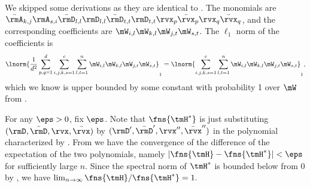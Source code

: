 \begin{proofof}{}
\begin{proofof}{}
We skipped some derivations as they are identical to .
The monomials are\\ $\bar{\rmA}_{k,j}\rmA_{s,i}\bar{\rmD}_{l,l}\rmD_{l,l}\bar{\rmD}_{t,t}\rmD_{t,t}\rvx_p\bar\rvx_p\rvx_q\bar\rvx_q$, and the corresponding coefficients are $\mW_{i,l}\mW_{k,l}\mW_{j,t}\mW_{s,t}$.
The $\ell_1$ norm of the coefficients is
\begin{equation}
\begin{split}
    \lnorm{\frac{1}{d^2}\sum_{p,q=1}^d\sum_{i,j,k,s=1}^c\sum_{l,t=1}^n \mW_{i,l}\mW_{k,l}\mW_{j,t}\mW_{s,t}}_1 = \lnorm{\sum_{i,j,k,s=1}^c\sum_{l,t=1}^n \mW_{i,l}\mW_{k,l}\mW_{j,t}\mW_{s,t}}_1,
\end{split}
\end{equation}
which we know is upper bounded by some constant with probability 1 over $\mW$ from .

For any $\eps>0$, fix $\eps$. Note that $\fns{\tmH^*}$ is just substituting $(\rmD,\bar\rmD,\rvx,\bar\rvx)$ by $(\rmD',\bar\rmD',\rvx'',\bar\rvx'')$ in the polynomial characterized by . From  we have the convergence of the difference of the expectation of the two polynomials, namely $|\fns{\tmH} - \fns{\tmH^*}| < \eps$ for sufficiently large $n$.
Since the spectral norm of $\tmH^*$ is bounded below from 0 by , we have $\lim_{n\to\infty} \fns{\tmH}/\fns{\tmH^*}=1.$
\end{proofof}


\end{proofof}
